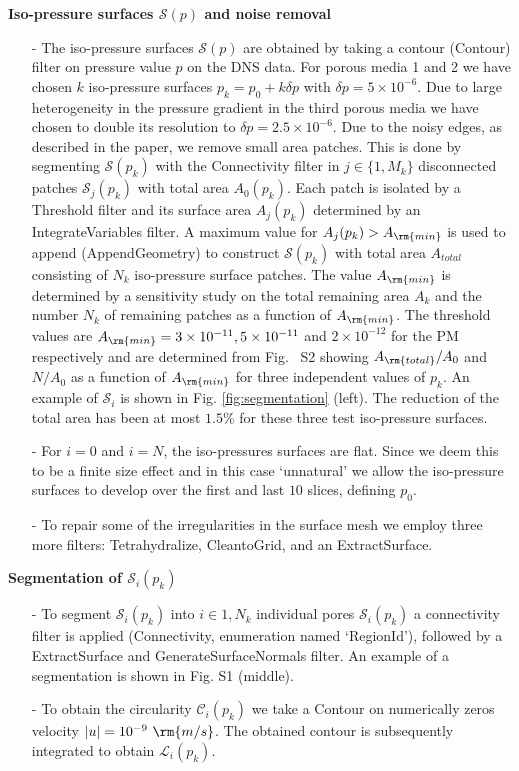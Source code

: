 \documentclass[draft,jgrga]{agutexSI2019}
\begin{document}
\begin{article}
\noindent\textbf{Iso-pressure surfaces $\mathcal{S}(p)$ and noise removal}
\begin{itemize}
	\item[-]The iso-pressure surfaces $\mathcal{S}(p)$ are obtained by taking a contour (Contour) filter on pressure value $p$ on the DNS data. For porous media 1 and 2 we have chosen $k$ iso-pressure surfaces $p_k = p_0+ k \delta p$ with $ \delta p= 5\times 10^{-6}$. Due to large heterogeneity in the pressure gradient in the third porous media we have chosen to double its resolution to $\delta p = 2.5\times 10^{-6}$. Due to the noisy edges, as described in the paper, we remove small area patches. This is done by segmenting $\mathcal{S}(p_k)$ with the Connectivity filter in $j\in \{1,M_k\}$ disconnected patches $\mathcal{S}_j(p_k)$ with total area $A_0(p_k)$. Each patch is isolated by a Threshold filter and its surface area $A_j(p_k)$ determined by an IntegrateVariables filter. A maximum value for $A_j(p_k)> A_{\rm{min}}$ is used to append (AppendGeometry) to construct $\mathcal{S}(p_k)$ with total area $A_{total}$ consisting of $N_k$ iso-pressure surface patches. The value  $A_{\rm{min}}$ is determined by a sensitivity study on the total remaining area $A_k$ and the number $N_k$ of remaining patches as a function of $ A_{\rm{min}}$. The threshold values are $A_{\rm{min}} = 3\times10^{-11}, 5\times10^{-11} $ and $2\times10^{-12}$ for the PM respectively and are determined from Fig.~ S2 showing $A_{\rm{total}}/A_0$ and $N/A_0$ as a function of $A_{\rm{min}}$ for three independent values of $p_k$. An example of $\mathcal{S}_i$ is shown in Fig. \ref{fig:segmentation} (left). The reduction of the total area has been at most $1.5\%$ for these three test iso-pressure surfaces.
	\item[-]For $i=0$ and $i=N$, the iso-pressures surfaces are flat. Since we deem this to be a finite size effect and in this case `unnatural' we allow the iso-pressure surfaces to develop over the first and last $10$ slices, defining $p_0$.
	\item[-]To repair some of the irregularities in the surface mesh we employ three more filters: Tetrahydralize, CleantoGrid, and an ExtractSurface.
\end{itemize}
\noindent\textbf{Segmentation of $\mathcal{S}_i(p_k)$}
\begin{itemize} 
	\item[-]To segment $\mathcal{S}_i(p_k)$ into $i\in{1,N_k}$ individual pores $\mathcal{S}_i(p_k)$ a connectivity filter is applied (Connectivity, enumeration named `RegionId'), followed by a ExtractSurface and GenerateSurfaceNormals filter. An example of a segmentation is shown in Fig. S1 (middle).
	\item[-] To obtain the circularity $\mathcal{C}_i(p_k)$ we take a Contour on numerically zeros velocity $|u|= 10^{-9}~\rm{m/s}$. The obtained contour is subsequently integrated to obtain $\mathcal{L}_i(p_k)$. 


\end{itemize}
\end{article}
\end{document}
